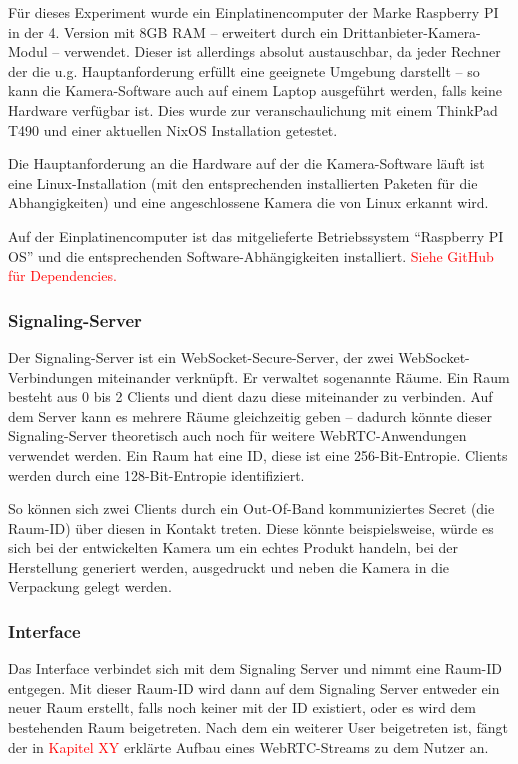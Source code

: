 \documentclass{article}
\begin{document}
\begin{onecolumn}
Für dieses Experiment wurde ein Einplatinencomputer der Marke Raspberry PI in
der 4. Version mit 8GB RAM – erweitert durch ein Drittanbieter-Kamera-Modul –
verwendet. Dieser ist allerdings absolut austauschbar, da jeder Rechner der
die u.g. Hauptanforderung erfüllt eine geeignete Umgebung darstellt – so kann
die Kamera-Software auch auf einem Laptop ausgeführt werden, falls keine
Hardware verfügbar ist. Dies wurde zur veranschaulichung mit einem ThinkPad
T490 und einer aktuellen NixOS Installation getestet.

Die Hauptanforderung an die Hardware auf der die Kamera-Software läuft ist eine
Linux-Installation (mit den entsprechenden installierten Paketen für die
Abhangigkeiten) und eine angeschlossene Kamera die von Linux erkannt wird.

Auf der Einplatinencomputer ist das mitgelieferte Betriebssystem ``Raspberry PI
OS'' und die entsprechenden Software-Abhängigkeiten installiert. 
\textcolor{red}{Siehe GitHub für Dependencies.}

\subsubsection{Signaling-Server}

Der Signaling-Server ist ein WebSocket-Secure-Server, der zwei
WebSocket-Verbindungen miteinander verknüpft. Er verwaltet sogenannte Räume.
Ein Raum besteht aus 0 bis 2 Clients und dient dazu diese miteinander zu
verbinden. Auf dem Server kann es mehrere Räume gleichzeitig geben – dadurch
könnte dieser Signaling-Server theoretisch auch noch für weitere
WebRTC-Anwendungen verwendet werden. Ein Raum hat eine ID, diese ist eine
256-Bit-Entropie. Clients werden durch eine 128-Bit-Entropie identifiziert.

So können sich zwei Clients durch ein Out-Of-Band kommuniziertes Secret (die
Raum-ID) über diesen in Kontakt treten. Diese könnte beispielsweise, würde es
sich bei der entwickelten Kamera um ein echtes Produkt handeln, bei der
Herstellung generiert werden, ausgedruckt und neben die Kamera in die
Verpackung gelegt werden.

\subsubsection{Interface}

Das Interface verbindet sich mit dem Signaling Server und nimmt eine Raum-ID
entgegen. Mit dieser Raum-ID wird dann auf dem Signaling Server entweder ein
neuer Raum erstellt, falls noch keiner mit der ID existiert, oder es wird dem
bestehenden Raum beigetreten. Nach dem ein weiterer User beigetreten ist, fängt
der in \textcolor{red}{Kapitel XY} erklärte Aufbau eines WebRTC-Streams zu dem
Nutzer an.


\end{onecolumn}
\end{document}
